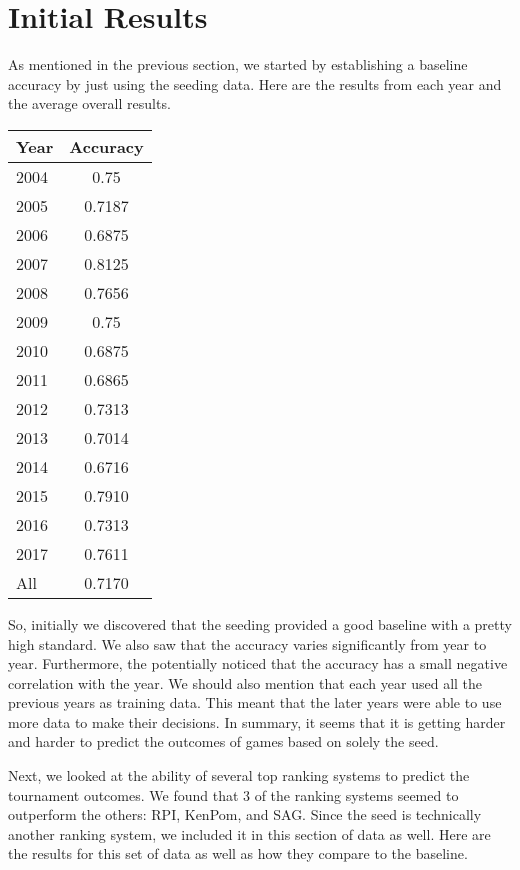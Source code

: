 \section{Initial Results}
As mentioned in the previous section, we started by establishing a baseline accuracy by just using the seeding data.
Here are the results from each year and the average overall results.

\vspace{0.5cm}
\begin{tabular}{lc}
  \toprule
  Year & Accuracy\\
  \midrule
  2004 & 0.75\\
  2005 & 0.7187\\
  2006 & 0.6875\\
  2007 & 0.8125\\
  2008 & 0.7656\\
  2009 & 0.75\\
  2010 & 0.6875\\
  2011 & 0.6865\\
  2012 & 0.7313\\
  2013 & 0.7014\\
  2014 & 0.6716\\
  2015 & 0.7910\\
  2016 & 0.7313\\
  2017 & 0.7611\\
  All & 0.7170\\
  \bottomrule
\end{tabular}
\vspace{0.5cm}

So, initially we discovered that the seeding provided a good baseline with a pretty high standard. 
We also saw that the accuracy varies significantly from year to year. 
Furthermore, the potentially noticed that the accuracy has a small negative correlation with the year. 
We should also mention that each year used all the previous years as training data.
This meant that the later years were able to use more data to make their decisions.
In summary, it seems that it is getting harder and harder to predict the outcomes of games based on solely the seed.

Next, we looked at the ability of several top ranking systems to predict the tournament outcomes.
We found that 3 of the ranking systems seemed to outperform the others: RPI, KenPom, and SAG.
Since the seed is technically another ranking system, we included it in this section of data as well.
Here are the results for this set of data as well as how they compare to the baseline.

